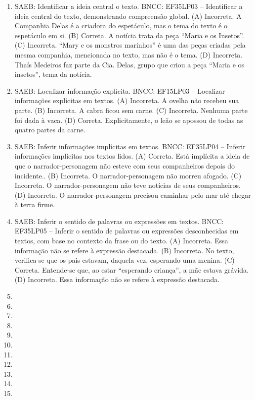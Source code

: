 \begin{enumerate}
\item
SAEB: Identificar a ideia central o texto.
BNCC: EF35LP03 -- Identificar a ideia central do texto, demonstrando
compreensão global.
(A) Incorreta. A Companhia Delas é a criadora do espetáculo, mas o tema do texto é o espetáculo em si.
(B) Correta. A notícia trata da peça ``Maria e os Insetos''.
(C) Incorreta. ``Mary e os monstros marinhos'' é uma das peças criadas
pela mesma companhia, mencionada no texto, mas não é o tema.
(D) Incorreta. Thaís Medeiros faz parte da Cia. Delas, grupo que criou a
peça ``Maria e os insetos'', tema da notícia.

\item
SAEB: Localizar informação explícita.
BNCC: EF15LP03 -- Localizar informações explícitas em textos.
(A) Incorreta. A ovelha não recebeu sua parte.
(B) Incorreta. A cabra ficou sem carne.
(C) Incorreta. Nenhuma parte foi dada à vaca.
(D) Correta. Explicitamente, o leão se apossou de todas as quatro partes da carne.

\item
SAEB: Inferir informações implícitas em textos.
BNCC: EF35LP04 -- Inferir informações implícitas nos textos lidos.
(A) Correta. Está implícita a ideia de que o narrador-personagem não esteve com seus companheiros depois do incidente..
(B) Incorreta. O narrador-personagem não morreu afogado.
(C) Incorreta. O narrador-personagem não teve notícias de seus companheiros.
(D) Incorreta. O narrador-personagem precisou caminhar pelo mar até chegar à terra firme.

\item
SAEB: Inferir o sentido de palavras ou expressões em textos.
BNCC: EF35LP05 -- Inferir o sentido de palavras ou expressões
desconhecidas em textos, com base no contexto da frase ou do texto.
(A) Incorreta. Essa informação não se refere à expressão destacada.
(B) Incorreta. No texto, verifica-se que os pais estavam, daquela vez,
esperando uma menina.
(C) Correta. Entende-se que, ao estar ``esperando criança'', a mãe estava
grávida.
(D) Incorreta. Essa informação não se refere à expressão destacada.

\item

\item

\item

\item

\item

\item

\item

\item

\item

\item

\item

\end{enumerate}

